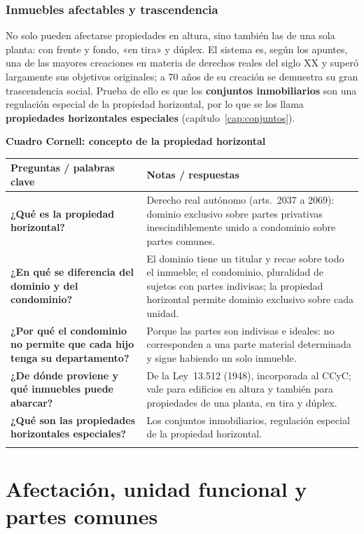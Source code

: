 \documentclass[12pt,oneside]{book}
\renewcommand{\arraystretch}{1.25}
\newcommand{\cq}[2]{\textbf{#1} & #2 \\[0.45em]}
\newcommand{\cornell}[3]{%
\par\bigskip\noindent\textbf{\large Cuadro Cornell: #1}\par\smallskip
\begin{center}
\small
\renewcommand{\arraystretch}{1.15}
\begin{tabularx}{\textwidth}{>{\raggedright\arraybackslash}p{0.27\textwidth}>{\raggedright\arraybackslash}X}
\toprule
\textbf{Preguntas / palabras clave} & \textbf{Notas / respuestas} \\
\midrule
#2
\midrule
\multicolumn{2}{p{\dimexpr\textwidth-2\tabcolsep\relax}}{\textbf{Resumen.} #3} \\
\bottomrule
\end{tabularx}
\end{center}
}
\begin{document}
\subsection{Inmuebles afectables y trascendencia}

No solo pueden afectarse propiedades en altura, sino también las de una sola planta: con frente y fondo, «en tira» y dúplex. El sistema es, según los apuntes, una de las mayores creaciones en materia de derechos reales del siglo XX y superó largamente sus objetivos originales; a 70 años de su creación %
se demuestra su gran trascendencia social. Prueba de ello es que los \textbf{conjuntos inmobiliarios} son una regulación especial de la propiedad horizontal, por lo que se los llama \textbf{propiedades horizontales especiales} (capítulo~\ref{cap:conjuntos}).

\cornell{concepto de la propiedad horizontal}{
\cq{¿Qué es la propiedad horizontal?}{Derecho real autónomo (arts.~2037 a 2069): dominio exclusivo sobre partes privativas inescindiblemente unido a condominio sobre partes comunes.}
\cq{¿En qué se diferencia del dominio y del condominio?}{El dominio tiene un titular y recae sobre todo el inmueble; el condominio, pluralidad de sujetos con partes indivisas; la propiedad horizontal permite dominio exclusivo sobre cada unidad.}
\cq{¿Por qué el condominio no permite que cada hijo tenga su departamento?}{Porque las partes son indivisas e ideales: no corresponden a una parte material determinada y sigue habiendo un solo inmueble.}
\cq{¿De dónde proviene y qué inmuebles puede abarcar?}{De la Ley~13.512 (1948), incorporada al CCyC; vale para edificios en altura y también para propiedades de una planta, en tira y dúplex.}
\cq{¿Qué son las propiedades horizontales especiales?}{Los conjuntos inmobiliarios, regulación especial de la propiedad horizontal.}
}{La propiedad horizontal articula un dominio exclusivo sobre la unidad con un condominio inescindible sobre lo común. Creada por la Ley~13.512 y recogida por el CCyC, permite unidades independientes dentro de un mismo inmueble.}

\chapter[Afectación, unidad funcional y partes comunes]{Afectación, unidad funcional y partes comunes}\label{cap:afectacion}
\end{document}
